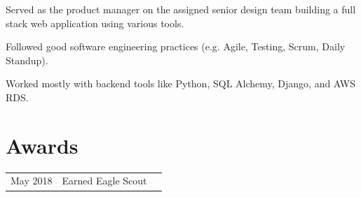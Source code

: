 \documentclass[]{latex/resume}
\begin{document}
\begin{minipage}[t]{0.75\textwidth}
     
    \begin{tightemize}
        \item Served as the product manager on the assigned senior design team building a full stack web application using various tools.
        \item Followed good software engineering practices (e.g. Agile, Testing, Scrum, Daily Standup).
        \item Worked mostly with backend tools like Python, SQL Alchemy, Django, and AWS RDS.
    \end{tightemize}

    \sectionsep




\section{Awards} 
    \begin{tabular}{rll}
        May 2018 & Earned Eagle Scout \\
    \end{tabular}
    \sectionsep
%
%   

\end{minipage} 
\hfill
\end{document}
